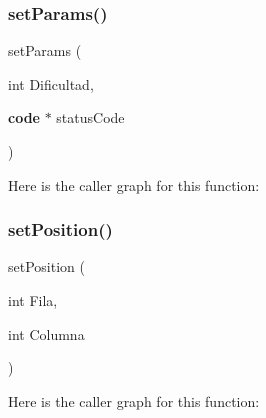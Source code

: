 \subsubsection{set\+Params()}
{\footnotesize{} set\+Params (\begin{DoxyParamCaption}\item[{int}]{Dificultad,  }\item[{{\bf code} $\ast$}]{status\+Code }\end{DoxyParamCaption})}

Here is the caller graph for this function\+:
\label{funciones_8c_a85f21b3597c4c3b3622a26ad6f249411} 
\subsubsection{set\+Position()}
{\footnotesize{} set\+Position (\begin{DoxyParamCaption}\item[{int}]{Fila,  }\item[{int}]{Columna }\end{DoxyParamCaption})}

Here is the caller graph for this function\+:
